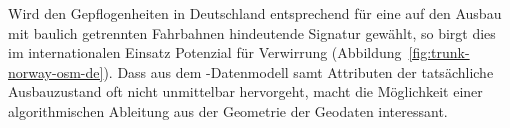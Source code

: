 \documentclass[../main/thesis.tex]{subfiles}
\begin{document}




Wird den Gepflogenheiten in Deutschland entsprechend für  eine auf den Ausbau mit baulich getrennten Fahrbahnen hindeutende Signatur gewählt, so birgt dies im internationalen Einsatz Potenzial für Verwirrung (Abbildung~\ref{fig:trunk-norway-osm-de}).
Dass aus dem \osm-Datenmodell samt Attributen der tatsächliche Ausbauzustand oft nicht unmittelbar hervorgeht, macht die Möglichkeit einer algorithmischen Ableitung aus der Geometrie der Geodaten interessant.



\end{document}
